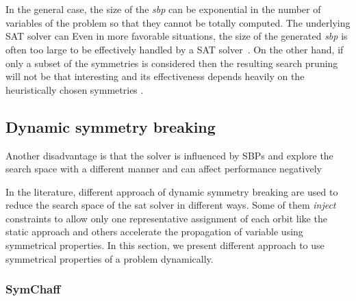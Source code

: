 \\
\\
\\
\\

\\

\\
\\



In the general case,
the size of the \textit{sbp} can be exponential in the number of variables of
the problem so that they cannot be totally computed. The underlying SAT solver can 
 Even in more favorable
situations, the size of the generated \textit{sbp} is often too large to be
effectively handled by a SAT solver~\cite{Luks2004}. On the other hand, if
only a subset of the symmetries is considered then the resulting search pruning
will not be that interesting and its effectiveness depends heavily on the
heuristically chosen symmetries \cite{biere2009handbook}.




\subsection{Dynamic symmetry breaking}


Another disadvantage is that the solver is influenced by SBPs and explore the search space with a different 
manner and can affect performance negatively 

In the literature, different approach of dynamic symmetry breaking are used to reduce the search space
of the sat solver in different ways. Some of them \textit{inject} constraints to allow only one representative assignment of each orbit like the static approach and others accelerate the propagation of variable using symmetrical properties. In this section, we present different approach to use symmetrical properties of a problem 
dynamically.


\subsubsection{SymChaff}

